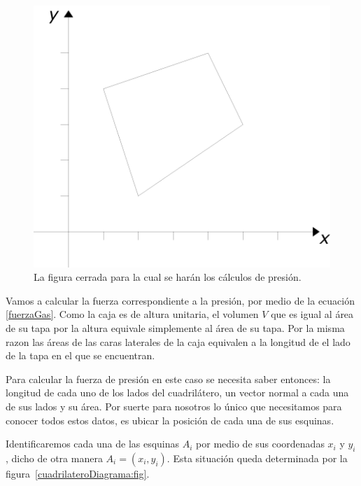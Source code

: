 \begin{figure}
 \centering
 \includegraphics[]{Img/cuadrilatero}
 \caption[Cuadrilátero]{ 
 La figura cerrada para la cual se harán los cálculos de presión.
 } \label{cuadrilatero:fig}
\end{figure}

Vamos a calcular la fuerza correspondiente a la presión, por medio de la ecuación \ref{fuerzaGas}. Como la caja es de altura unitaria, el volumen $V$ que es igual al área de su tapa por la altura equivale simplemente al área de su tapa. Por la misma razon las áreas de las caras laterales de la caja equivalen a la longitud de el lado de la tapa en el que se encuentran.

Para calcular la fuerza de presión en este caso se necesita saber entonces: la longitud de cada uno de los lados del cuadrilátero, un vector normal a cada una de sus lados y su área. Por suerte para nosotros lo único que necesitamos para conocer todos estos datos, es ubicar la posición de cada una de sus esquinas.

Identificaremos cada una de las esquinas $A_i$ por medio de sus coordenadas $x_i$ y $y_i$, dicho de otra manera $A_i = ( x_i , y_i)$. Esta situación queda determinada por la figura~\ref{cuadrilateroDiagrama:fig}.

